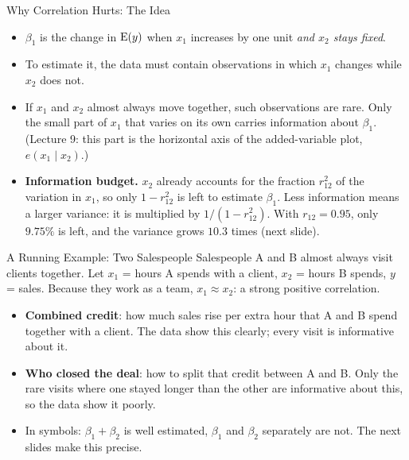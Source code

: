 \begin{frame}{Why Correlation Hurts: The Idea}
    \begin{itemize}
        \item $\beta_1$ is the change in $\operatorname{E}(y)$ when $x_1$ increases by one unit \emph{and $x_2$ stays fixed}.
        \item To estimate it, the data must contain observations in which $x_1$ changes while $x_2$ does not.
        \item If $x_1$ and $x_2$ almost always move together, such observations are rare. Only the small part of $x_1$ that varies on its own carries information about $\beta_1$. (Lecture 9: this part is the horizontal axis of the added-variable plot, $e(x_1\mid x_2)$.)
        \item \textbf{Information budget.} $x_2$ already accounts for the fraction $r_{12}^2$ of the variation in $x_1$, so only $1-r_{12}^2$ is left to estimate $\beta_1$. Less information means a larger variance: it is multiplied by $1/(1-r_{12}^2)$. With $r_{12}=0.95$, only $9.75\%$ is left, and the variance grows $10.3$ times (next slide).
    \end{itemize}
\end{frame}


\begin{frame}{A Running Example: Two Salespeople}
    Salespeople A and B almost always visit clients together. Let $x_1$ = hours A spends with a client, $x_2$ = hours B spends, $y$ = sales. Because they work as a team, $x_1\approx x_2$: a strong positive correlation.
    \begin{itemize}
        \item \textbf{Combined credit}: how much sales rise per extra hour that A and B spend together with a client. The data show this clearly; every visit is informative about it.
        \item \textbf{Who closed the deal}: how to split that credit between A and B. Only the rare visits where one stayed longer than the other are informative about this, so the data show it poorly.
        \item In symbols: $\beta_1+\beta_2$ is well estimated, $\beta_1$ and $\beta_2$ separately are not. The next slides make this precise.
    \end{itemize}
\end{frame}


